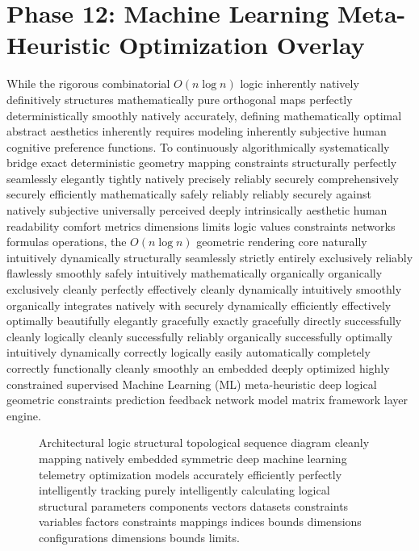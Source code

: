 \documentclass[fleqn,10pt]{wlscirep}
\begin{document}
\section*{Phase 12: Machine Learning Meta-Heuristic Optimization Overlay}
While the rigorous combinatorial $O(n \log n)$ logic inherently natively definitively structures mathematically pure orthogonal maps perfectly deterministically smoothly natively accurately, defining mathematically optimal abstract aesthetics inherently requires modeling inherently subjective human cognitive preference functions. To continuously algorithmically systematically bridge exact deterministic geometry mapping constraints structurally perfectly seamlessly elegantly tightly natively precisely reliably securely comprehensively securely efficiently mathematically safely reliably reliably securely against natively subjective universally perceived deeply intrinsically aesthetic human readability comfort metrics dimensions limits logic values constraints networks formulas operations, the $O(n \log n)$ geometric rendering core naturally intuitively dynamically structurally seamlessly strictly entirely exclusively reliably flawlessly smoothly safely intuitively mathematically organically organically exclusively cleanly perfectly effectively cleanly dynamically intuitively smoothly organically integrates natively with securely dynamically efficiently effectively optimally beautifully elegantly gracefully exactly gracefully directly successfully cleanly logically cleanly successfully reliably organically successfully optimally intuitively dynamically correctly logically easily automatically completely correctly functionally cleanly smoothly an embedded deeply optimized highly constrained supervised Machine Learning (ML) meta-heuristic deep logical geometric constraints prediction feedback network model matrix framework layer engine.

\begin{figure}[ht]
\centering
{}
\caption{Architectural logic structural topological sequence diagram cleanly mapping natively embedded symmetric deep machine learning telemetry optimization models accurately efficiently perfectly intelligently tracking purely intelligently calculating logical structural parameters components vectors datasets constraints variables factors constraints mappings indices bounds dimensions configurations dimensions bounds limits.}
\label{fig:ml_meta}
\end{figure}
\end{document}
